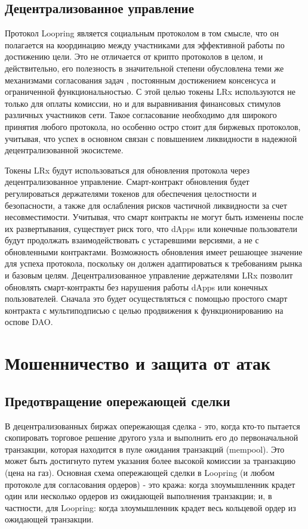 \documentclass[utf8,nofonts]{article}
\begin{document}
\begin{multicols}{2}
			\subsection{Децентрализованное управление}
			Протокол Loopring является социальным протоколом в том смысле, что он полагается на координацию между участниками для эффективной работы по достижению цели. Это не отличается от крипто протоколов в целом, и действительно, его полезность в значительной степени обусловлена теми же механизмами согласования задач \cite{vitalikgovernance}, постоянным достижением консенсуса и ограниченной функциональностью. С этой целью токены LRx используются не только для оплаты комиссии, но и для выравнивания финансовых стимулов различных участников сети. Такое согласование необходимо для широкого принятия любого протокола, но особенно остро стоит для биржевых протоколов, учитывая, что успех в основном связан с повышением ликвидности в надежной децентрализованной экосистеме.
			
			Токены LRx будут использоваться для обновления протокола через децентрализованное управление. Смарт-контракт обновления будет регулироваться держателями токенов для обеспечения целостности и безопасности, а также для ослабления рисков частичной ликвидности за счет несовместимости. Учитывая, что смарт контракты не могут быть изменены после их развертывания, существует риск того, что dApps или конечные пользователи будут продолжать взаимодействовать с устаревшими версиями, а не с обновленными контрактами. Возможность обновления имеет решающее значение для успеха протокола, поскольку он должен адаптироваться к требованиям рынка и базовым целям. Децентрализованное управление держателями LRx позволит обновлять смарт-контракты без нарушения работы dApps или конечных пользователей. Сначала это будет осуществляться с помощью простого смарт контракта с мультиподписью с целью продвижения к функционированию на оспове DAO.
			\section{Мошенничество и защита от атак}
			\subsection{Предотвращение опережающей сделки\label{sec:dual_authoring}}
			
			
			В децентрализованных биржах опережающая сделка - это, когда кто-то пытается скопировать торговое решение другого узла и выполнить его до первоначальной транзакции, которая находится в пуле ожидания транзакций (mempool). Это может быть достигнуто путем указания более высокой комиссии за транзакцию (цена на газ). Основная схема опережающей сделки в Loopring (и любом протоколе для согласования ордеров) - это кража: когда злоумышленник крадет один или несколько ордеров из ожидающей выполнения транзакции; и, в частности, для Loopring: когда злоумышленник крадет весь кольцевой ордер из ожидающей транзакции.
			

\end{multicols}
\end{document}
